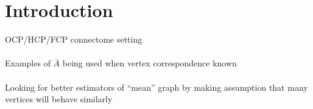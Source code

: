 \section{Introduction}

OCP/HCP/FCP connectome setting\\\\
Examples of $\bar{A}$ being used when vertex correspondence known\\\\
Looking for better estimators of “mean” graph by making assumption that many vertices will behave similarly\\
\cite{Athreya2013}
\cite{Cerqueira2015}
\cite{Fishkind2012}
\cite{Freer2014}\\
\cite{Oliveira2009}
